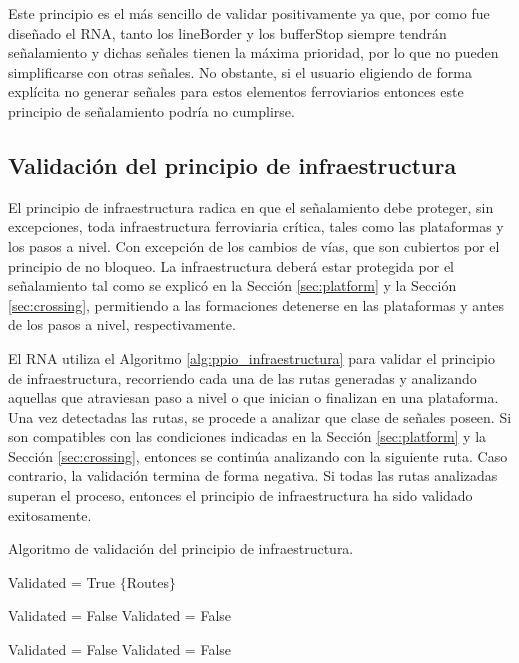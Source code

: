 		Este principio es el más sencillo de validar positivamente ya que, por como fue diseñado el RNA, tanto los lineBorder y los bufferStop siempre tendrán señalamiento y dichas señales tienen la máxima prioridad, por lo que no pueden simplificarse con otras señales. No obstante, si el usuario eligiendo de forma explícita no generar señales para estos elementos ferroviarios entonces este principio de señalamiento podría no cumplirse.		
				
	\subsection{Validación del principio de infraestructura}
		
		El principio de infraestructura radica en que el señalamiento debe proteger, sin excepciones, toda infraestructura ferroviaria crítica, tales como las plataformas y los pasos a nivel. Con excepción de los cambios de vías, que son cubiertos por el principio de no bloqueo. La infraestructura deberá estar protegida por el señalamiento tal como se explicó en la Sección \ref{sec:platform} y la Sección \ref{sec:crossing}, permitiendo a las formaciones detenerse en las plataformas y antes de los pasos a nivel, respectivamente.

		El RNA utiliza el Algoritmo \ref{alg:ppio_infraestructura} para validar el principio de infraestructura, recorriendo cada una de las rutas generadas y analizando aquellas que atraviesan paso a nivel o que inician o finalizan en una plataforma. Una vez detectadas las rutas, se procede a analizar que clase de señales poseen. Si son compatibles con las condiciones indicadas en la Sección \ref{sec:platform} y la Sección \ref{sec:crossing}, entonces se continúa analizando con la siguiente ruta. Caso contrario, la validación termina de forma negativa. Si todas las rutas analizadas superan el proceso, entonces el principio de infraestructura ha sido validado exitosamente.
		
		\begin{algorithm}[hbt!]
			\caption{Algoritmo de validación del principio de infraestructura.}\label{alg:ppio_infraestructura}
			\DontPrintSemicolon
			\SetNoFillComment
			\LinesNotNumbered 
			Validated = True\;
			$\{$Routes$\}$\; 
			{
				{
					{
						Validated = False\;
					}
					{
						Validated = False\;
					}
				}
				
				{
					{
						Validated = False\;
					}
					{
						Validated = False\;
					}
				}
			}
			
		\end{algorithm}
		
